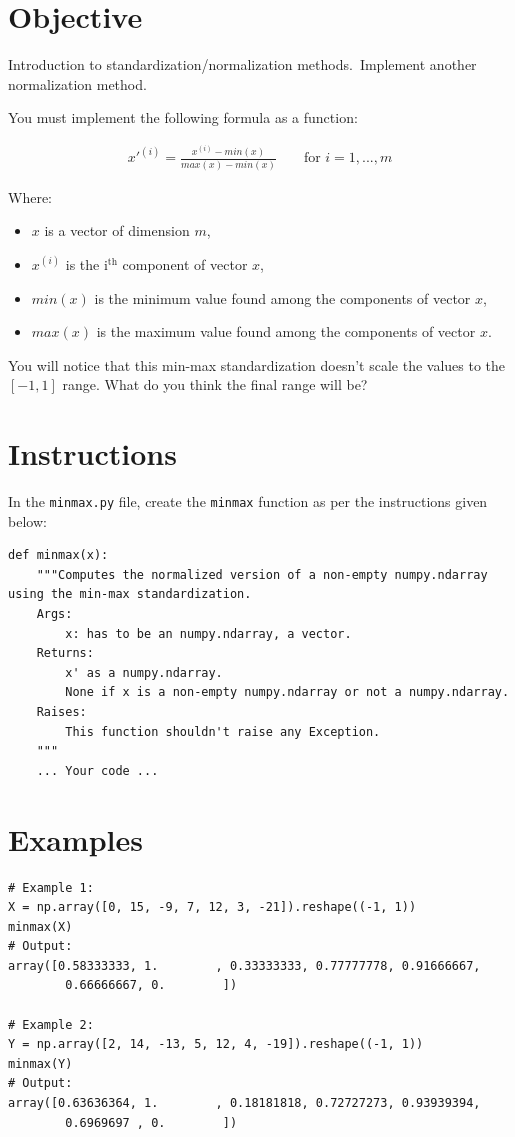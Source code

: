 \documentclass{42-en}
\begin{document}
\section*{Objective}
Introduction to standardization/normalization methods.\
Implement another normalization method.

You must implement the following formula as a function: 

$$
\begin{matrix}
  x'^{(i)} = \frac{x^{(i)} - min(x)}{max(x) - min(x)} & & \text{ for $i = 1, ..., m$}
\end{matrix}
$$

Where:
\begin{itemize}
  \item $x$ is a vector of dimension $m$,
  \item $x^{(i)}$ is the i$^\text{th}$ component of vector $x$,
  \item $min(x)$ is the minimum value found among the components of vector $x$,
  \item $max(x)$ is the maximum value found among the components of vector $x$.
\end{itemize}

You will notice that this min-max standardization doesn't scale the values to the $[-1,1]$ range.
What do you think the final range will be?

\section*{Instructions}
In the \texttt{minmax.py} file, create the \texttt{minmax} function as per the instructions given below:

\begin{verbatim}
def minmax(x):
	"""Computes the normalized version of a non-empty numpy.ndarray using the min-max standardization.
	Args:
		x: has to be an numpy.ndarray, a vector.
	Returns:
		x' as a numpy.ndarray. 
		None if x is a non-empty numpy.ndarray or not a numpy.ndarray.
	Raises:
		This function shouldn't raise any Exception.
	"""
    ... Your code ...
\end{verbatim}

\section*{Examples}
\begin{verbatim}
# Example 1:
X = np.array([0, 15, -9, 7, 12, 3, -21]).reshape((-1, 1))
minmax(X)
# Output:
array([0.58333333, 1.        , 0.33333333, 0.77777778, 0.91666667,
		0.66666667, 0.        ])

# Example 2:
Y = np.array([2, 14, -13, 5, 12, 4, -19]).reshape((-1, 1))
minmax(Y)
# Output:
array([0.63636364, 1.        , 0.18181818, 0.72727273, 0.93939394,
		0.6969697 , 0.        ])
\end{verbatim}
\end{document}
